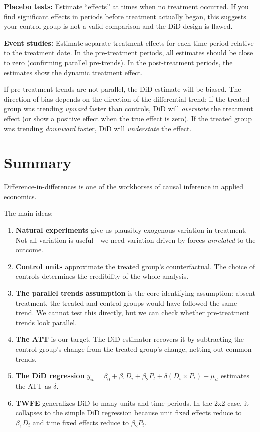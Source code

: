\documentclass[
  letterpaper,
  DIV=11,
  numbers=noendperiod]{scrreprt}
\providecommand{\tightlist}{%
  \setlength{\itemsep}{0pt}\setlength{\parskip}{0pt}}
\begin{document}
\textbf{Placebo tests:} Estimate ``effects'' at times when no treatment
occurred. If you find significant effects in periods before treatment
actually began, this suggests your control group is not a valid
comparison and the DiD design is flawed.

\textbf{Event studies:} Estimate separate treatment effects for each
time period relative to the treatment date. In the pre-treatment
periods, all estimates should be close to zero (confirming parallel
pre-trends). In the post-treatment periods, the estimates show the
dynamic treatment effect.

If pre-treatment trends are not parallel, the DiD estimate will be
biased. The direction of bias depends on the direction of the
differential trend: if the treated group was trending \emph{upward}
faster than controls, DiD will \emph{overstate} the treatment effect (or
show a positive effect when the true effect is zero). If the treated
group was trending \emph{downward} faster, DiD will \emph{understate}
the effect.

\section{Summary}\label{summary-7}

Difference-in-differences is one of the workhorses of causal inference
in applied economics.

The main ideas:

\begin{enumerate}
\def\labelenumi{\arabic{enumi}.}
\tightlist
\item
  \textbf{Natural experiments} give us plausibly exogenous variation in
  treatment. Not all variation is useful---we need variation driven by
  forces \emph{unrelated} to the outcome.
\item
  \textbf{Control units} approximate the treated group's counterfactual.
  The choice of controls determines the credibility of the whole
  analysis.
\item
  \textbf{The parallel trends assumption} is the core identifying
  assumption: absent treatment, the treated and control groups would
  have followed the same trend. We cannot test this directly, but we can
  check whether pre-treatment trends look parallel.
\item
  \textbf{The ATT} is our target. The DiD estimator recovers it by
  subtracting the control group's change from the treated group's
  change, netting out common trends.
\item
  \textbf{The DiD regression}
  \(y_{it} = \beta_0 + \beta_1 D_i + \beta_2 P_t + \delta(D_i \times P_t) + \mu_{it}\)
  estimates the ATT as \(\delta\).
\item
  \textbf{TWFE} generalizes DiD to many units and time periods. In the
  2x2 case, it collapses to the simple DiD regression because unit fixed
  effects reduce to \(\beta_1 D_i\) and time fixed effects reduce to
  \(\beta_2 P_t\).
\end{enumerate}
\end{document}
